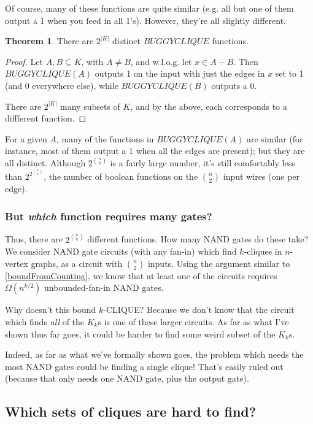 \documentclass[12pt]{article}
\theoremstyle{definition}
\newtheorem{thm}{Theorem}[section]
\begin{document}
Of course, many of these functions are quite similar (e.g. all but one of them
output a 1 when you feed in all 1's). However, they're all slightly different.

\begin{thm}
\label{buggyDistinct}
There are  $2^{|K|}$ distinct $BUGGYCLIQUE$ functions.
\end{thm}
\begin{proof}

Let $A,B \subseteq K$, with $A \neq B$, and w.l.o.g.
let $x \in A-B$. Then $BUGGYCLIQUE(A)$ outputs 1 on the input
with just the edges in $x$ set to 1 (and 0 everywhere else),
while $BUGGYCLIQUE(B)$ outputs a 0.

There are $2^{|K|}$ many subsets of $K$,
and by the above, each corresponds to a diffferent function.
\end{proof}

For a given $A$, many of the functions in $BUGGYCLIQUE(A)$
are similar (for instance, most
of them output a 1 when all the edges are present);
but they are all distinct.
Although $2^{n \choose k}$ is a fairly large number,
it's still comfortably less than $2^{2^{n \choose 2}}$, the number of boolean
functions on the ${n \choose 2}$ input wires (one per edge).

\subsubsection{But {\em which} function requires many gates?}

Thus, there are $2^{n \choose k}$ different functions. 
How many NAND gates do these take?
We consider NAND gate circuits (with any fan-in) which find $k$-cliques in $n$-vertex
graphs, as a circuit with $n \choose 2$ inputs. Using the argument similar to
\ref{boundFromCounting}, we know that at least one of the circuits requires
$\Omega(n^{k/2})$ unbounded-fan-in NAND gates.

Why doesn't this bound $k$-CLIQUE?
Because we don't know that the circuit which finds {\em all} of the
$K_k$s is one of these larger circuits. As far as what I've
shown thus far goes, it could be harder to find some weird subset of the $K_k$s.

Indeed, as far as what we've formally shown goes, the problem which needs
the most NAND gates could be finding a single clique! That's easily ruled out
(because that only needs one NAND gate, plus the output gate).

\subsection{Which sets of cliques are hard to find?}
\label{sec:whichCliques}
\end{document}
